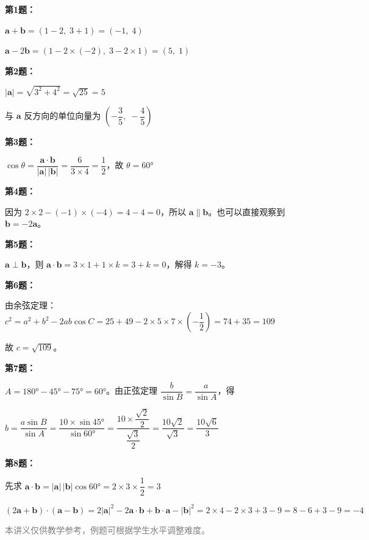 \documentclass[12pt, a4paper]{ctexart}
\begin{document}
\vspace{12pt}
\begin{knowledgebox}[参考答案]
\textbf{第1题：}

$\boldsymbol{a}+\boldsymbol{b}=(1-2,\;3+1)=(-1,\;4)$

$\boldsymbol{a}-2\boldsymbol{b}=(1-2\times(-2),\;3-2\times1)=(5,\;1)$

\medskip
\textbf{第2题：}

$|\boldsymbol{a}|=\sqrt{3^2+4^2}=\sqrt{25}=5$

与 $\boldsymbol{a}$ 反方向的单位向量为 $\left(-\dfrac{3}{5},\;-\dfrac{4}{5}\right)$

\medskip
\textbf{第3题：}

$\cos\theta=\dfrac{\boldsymbol{a}\cdot\boldsymbol{b}}{|\boldsymbol{a}|\,|\boldsymbol{b}|}=\dfrac{6}{3\times4}=\dfrac{1}{2}$，故 $\theta=60°$

\medskip
\textbf{第4题：}

因为 $2\times2-(-1)\times(-4)=4-4=0$，所以 $\boldsymbol{a}\parallel\boldsymbol{b}$。也可以直接观察到 $\boldsymbol{b}=-2\boldsymbol{a}$。

\medskip
\textbf{第5题：}

$\boldsymbol{a}\perp\boldsymbol{b}$，则 $\boldsymbol{a}\cdot\boldsymbol{b}=3\times1+1\times k=3+k=0$，解得 $k=-3$。

\medskip
\textbf{第6题：}

由余弦定理：$c^2=a^2+b^2-2ab\cos C=25+49-2\times5\times7\times\left(-\dfrac{1}{2}\right)=74+35=109$

故 $c=\sqrt{109}$。

\medskip
\textbf{第7题：}

$A=180°-45°-75°=60°$。由正弦定理 $\dfrac{b}{\sin B}=\dfrac{a}{\sin A}$，得

$b=\dfrac{a\sin B}{\sin A}=\dfrac{10\times\sin45°}{\sin60°}=\dfrac{10\times\dfrac{\sqrt{2}}{2}}{\dfrac{\sqrt{3}}{2}}=\dfrac{10\sqrt{2}}{\sqrt{3}}=\dfrac{10\sqrt{6}}{3}$

\medskip
\textbf{第8题：}

先求 $\boldsymbol{a}\cdot\boldsymbol{b}=|\boldsymbol{a}|\,|\boldsymbol{b}|\cos60°=2\times3\times\dfrac{1}{2}=3$

$(2\boldsymbol{a}+\boldsymbol{b})\cdot(\boldsymbol{a}-\boldsymbol{b})=2|\boldsymbol{a}|^2-2\boldsymbol{a}\cdot\boldsymbol{b}+\boldsymbol{b}\cdot\boldsymbol{a}-|\boldsymbol{b}|^2=2\times4-2\times3+3-9=8-6+3-9=-4$
\end{knowledgebox}

\vfill
\begin{center}
\small\textcolor{gray}{本讲义仅供教学参考，例题可根据学生水平调整难度。}
\end{center}
\end{document}
